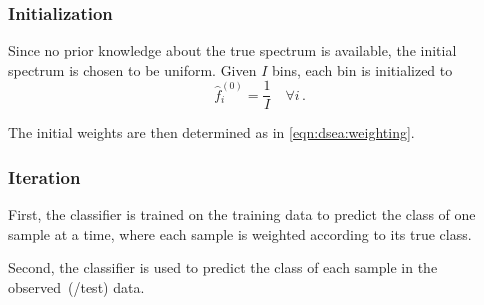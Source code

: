 

\subsubsection{Initialization}
Since no prior knowledge about the true spectrum is available,
  the initial spectrum is chosen to be uniform.
Given $I$ bins,
  each bin is initialized to
\begin{equation}
  \hat f_i^{(0)} = \frac{1}{I} \quad \forall i \, .
\end{equation}

The initial weights are then determined as in \autoref{eqn:dsea:weighting}.



\subsubsection{Iteration}
First,
the classifier is trained
  on the training data
to predict the class of one sample at a time,
where each sample is weighted according to its true class.

Second,
the classifier is used to predict the class of each sample
in the observed~(/test) data.

